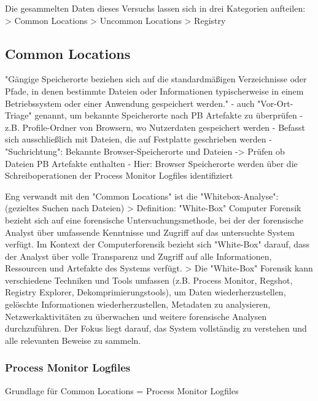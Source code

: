 Die gesammelten Daten dieses Versuchs lassen sich in drei Kategorien aufteilen:
> Common Locations
> Uncommon Locations	
> Registry

\subsection{Common Locations}

"Gängige Speicherorte beziehen sich auf die standardmäßigen Verzeichnisse oder Pfade, in denen bestimmte Dateien oder Informationen typischerweise in einem Betriebssystem oder einer Anwendung gespeichert werden."	
- auch "Vor-Ort-Triage" \cite{Horsman.2019} genannt, um bekannte Speicherorte nach PB Artefakte zu überprüfen
- z.B. Profile-Ordner von Browsern, wo Nutzerdaten gespeichert werden
- Befasst sich ausschließlich mit Dateien, die auf Festplatte geschrieben werden
- "Suchrichtung": Bekannte Browser-Speicherorte und Dateien -> Prüfen ob Dateien PB Artefakte enthalten
- Hier: Browser Speicherorte werden über die Schreiboperationen der Process Monitor Logfiles identifiziert 

Eng verwandt mit den "Common Locations" ist die "Whitebox-Analyse": (gezieltes Suchen nach Dateien) \cite{Bonetti.2014}
> Definition: "White-Box" Computer Forensik bezieht sich auf eine forensische Untersuchungsmethode, bei der der forensische Analyst über umfassende Kenntnisse und Zugriff auf das untersuchte System verfügt. Im Kontext der Computerforensik bezieht sich "White-Box" darauf, dass der Analyst über volle Transparenz und Zugriff auf alle Informationen, Ressourcen und Artefakte des Systems verfügt.
> Die "White-Box" Forensik kann verschiedene Techniken und Tools umfassen (z.B. Process Monitor, Regshot, Registry Explorer, Dekomprimierungstools), um Daten wiederherzustellen, gelöschte Informationen wiederherzustellen, Metadaten zu analysieren, Netzwerkaktivitäten zu überwachen und weitere forensische Analysen durchzuführen. Der Fokus liegt darauf, das System vollständig zu verstehen und alle relevanten Beweise zu sammeln.

\subsubsection*{Process Monitor Logfiles}

Grundlage für Common Locations = Process Monitor Logfiles

